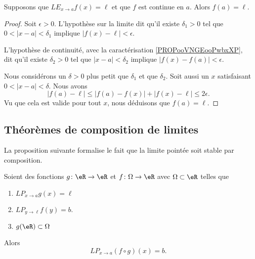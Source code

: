 \begin{lemma}     \label{LEMooNEGOooCllIMN}
    Supposons que \( {LE}_{x\to a}f(x)=\ell\) et que \( f\) est continue en \( a\). Alors \( f(a)=\ell\).
\end{lemma}

\begin{proof}
    Soit \( \epsilon>0\). L'hypothèse sur la limite dit qu'il existe \( \delta_1>0\) tel que \( 0<| x-a |<\delta_1\) implique \( | f(x)-\ell |<\epsilon\).

    L'hypothèse de continuité, avec la caractérisation \ref{PROPooVNGEooPwbxXP}, dit qu'il existe \( \delta_2>0\) tel que \( | x-a |<\delta_2\) implique \( | f(x)-f(a) |<\epsilon\).

    Nous considérons un \( \delta>0\) plus petit que \( \delta_1\) et que \( \delta_2\). Soit aussi un \( x\) satisfaisant \( 0<| x-a |<\delta\). Nous avons
    \begin{equation}
        | f(a)-\ell |\leq| f(a)-f(x) |+| f(x)-\ell |\leq 2\epsilon.
    \end{equation}
    Vu que cela est valide pour tout \( x\), nous déduisons que \( f(a)=\ell\).
\end{proof}

\subsection{Théorèmes de composition de limites}

La proposition suivante formalise le fait que la limite pointée soit stable par composition.
\begin{theorem}     \label{THOooOYXDooKDPkuW}
    Soient des fonctions \( g\colon \eR\to \eR\) et \( f\colon \Omega\to \eR\) avec \( \Omega\subset \eR\) telles que
    \begin{enumerate}
        \item
        \( {LP}_{x\to a}g(x)=\ell\) 
    \item
        \( {LP}_{y\to \ell}f(y)=b\).
    \item
        \( g(\eR)\subset \Omega\)
    \end{enumerate}
    Alors
    \begin{equation}
        {LP}_{x\to a} (f\circ g)(x)=b.
    \end{equation}
\end{theorem}

